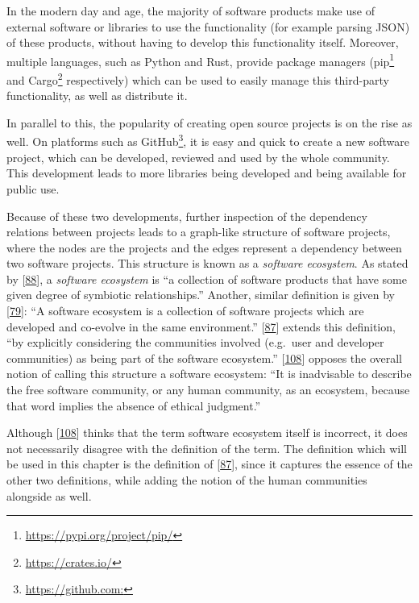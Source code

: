 \documentclass[]{book}
\let\rmarkdownfootnote\footnote%
\def\footnote{\protect\rmarkdownfootnote}
\begin{document}
In the modern day and age, the majority of software products make use of
external software or libraries to use the functionality (for example
parsing JSON) of these products, without having to develop this
functionality itself. Moreover, multiple languages, such as Python and
Rust, provide package managers (pip\footnote{\url{https://pypi.org/project/pip/}}
and Cargo\footnote{\url{https://crates.io/}} respectively) which can be
used to easily manage this third-party functionality, as well as
distribute it.

In parallel to this, the popularity of creating open source projects is
on the rise as well. On platforms such as GitHub\footnote{\url{https://github.com:}},
it is easy and quick to create a new software project, which can be
developed, reviewed and used by the whole community. This development
leads to more libraries being developed and being available for public
use.

Because of these two developments, further inspection of the dependency
relations between projects leads to a graph-like structure of software
projects, where the nodes are the projects and the edges represent a
dependency between two software projects. This structure is known as a
\emph{software ecosystem}. As stated by
{[}\protect\hyperlink{ref-Messerschmitt2003}{88}{]}, a \emph{software
ecosystem} is ``a collection of software products that have some given
degree of symbiotic relationships.'' Another, similar definition is
given by {[}\protect\hyperlink{ref-Lungu2009}{79}{]}: ``A software
ecosystem is a collection of software projects which are developed and
co-evolve in the same environment.''
{[}\protect\hyperlink{ref-Mens2013}{87}{]} extends this definition, ``by
explicitly considering the communities involved (e.g.~user and developer
communities) as being part of the software ecosystem.''
{[}\protect\hyperlink{ref-Stallman2002}{108}{]} opposes the overall
notion of calling this structure a software ecosystem: ``It is
inadvisable to describe the free software community, or any human
community, as an ecosystem, because that word implies the absence of
ethical judgment.''

Although {[}\protect\hyperlink{ref-Stallman2002}{108}{]} thinks that the
term software ecosystem itself is incorrect, it does not necessarily
disagree with the definition of the term. The definition which will be
used in this chapter is the definition of
{[}\protect\hyperlink{ref-Mens2013}{87}{]}, since it captures the
essence of the other two definitions, while adding the notion of the
human communities alongside as well.
\end{document}
